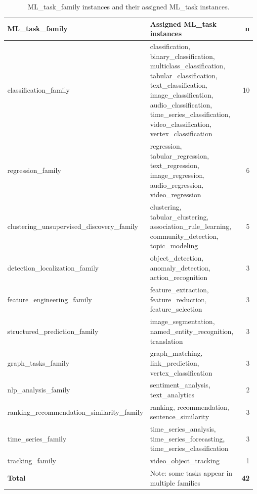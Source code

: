 \begin{table}[H]
\centering
\caption[ML\_task\_family instances]{ML\_task\_family instances and their assigned ML\_task instances.}
\label{tab:ml-task-families}
\begin{tabularx}{\textwidth}{>{\raggedright\arraybackslash}p{4cm}Xr}
\toprule
\textbf{ML\_task\_family} & \textbf{Assigned ML\_task instances} & \textbf{n} \\
\midrule
classification\_\allowbreak family
  & classification, binary\_classification, multiclass\_classification,
    tabular\_classification, text\_classification, image\_classification,
    audio\_classification, time\_series\_classification, video\_classification,
    vertex\_classification & 10 \\
\midrule
regression\_\allowbreak family
  & regression, tabular\_regression, text\_regression, image\_regression,
    audio\_regression, video\_regression & 6 \\
\midrule
clustering\_\allowbreak unsupervised\_\allowbreak discovery\_\allowbreak family
  & clustering, tabular\_clustering, association\_rule\_learning,
    community\_detection, topic\_modeling & 5 \\
\midrule
detection\_\allowbreak localization\_\allowbreak family
  & object\_detection, anomaly\_detection, action\_recognition & 3 \\
\midrule
feature\_\allowbreak engineering\_\allowbreak family
  & feature\_extraction, feature\_reduction, feature\_selection & 3 \\
\midrule
structured\_\allowbreak prediction\_\allowbreak family
  & image\_segmentation, named\_entity\_recognition, translation & 3 \\
\midrule
graph\_tasks\_\allowbreak family
  & graph\_matching, link\_prediction, vertex\_classification & 3 \\
\midrule
nlp\_analysis\_\allowbreak family
  & sentiment\_analysis, text\_analytics & 2 \\
\midrule
ranking\_\allowbreak recommendation\_\allowbreak similarity\_\allowbreak family
  & ranking, recommendation, sentence\_similarity & 3 \\
\midrule
time\_series\_\allowbreak family
  & time\_series\_analysis, time\_series\_forecasting, time\_series\_classification & 3 \\
\midrule
tracking\_\allowbreak family
  & video\_object\_tracking & 1 \\
\midrule
\textbf{Total} & \footnotesize{Note: some tasks appear in multiple families} & \textbf{42} \\
\bottomrule
\end{tabularx}
\end{table}

